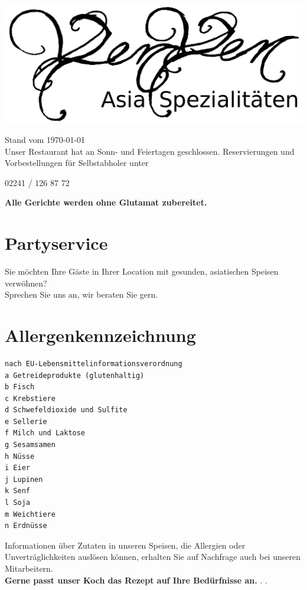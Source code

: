 \documentclass[12pt,a5paper,oneside]{scrreprt}
\begin{document}
 

\begin{center}
\includegraphics[width=\textwidth]{gfx/yenyen_head_bw_text.png}
\end{center}

{\small Stand vom \today}\\[5mm]
Unser Restaurant hat an Sonn- und Feiertagen geschlossen. Reservierungen und Vorbestellungen für Selbstabholer unter
\begin{center}
{\Huge 02241 / 126 87 72}
\end{center}

\textbf{Alle Gerichte werden ohne Glutamat zubereitet.}

\section*{Partyservice}
Sie möchten Ihre Gäste in Ihrer Location mit gesunden, asiatischen Speisen verwöhnen?\\ 
Sprechen Sie uns an, wir beraten Sie gern.
\newpage


\newpage
\section*{Allergenkennzeichnung}
\begin{verbatim}
nach EU-Lebensmittelinformationsverordnung
a Getreideprodukte (glutenhaltig) 
b Fisch
c Krebstiere
d Schwefeldioxide und Sulfite 
e Sellerie
f Milch und Laktose
g Sesamsamen
h Nüsse
i Eier
j Lupinen
k Senf
l Soja
m Weichtiere
n Erdnüsse
\end{verbatim}
Informationen über Zutaten in unseren Speisen, die Allergien
oder Unverträglichkeiten auslösen können, erhalten Sie auf Nachfrage
auch bei unseren Mitarbeitern.\\ 
\textbf{Gerne passt unser Koch das Rezept auf Ihre Bedürfnisse an.} %
\newpage
.
\newpage
.
\end{document}

